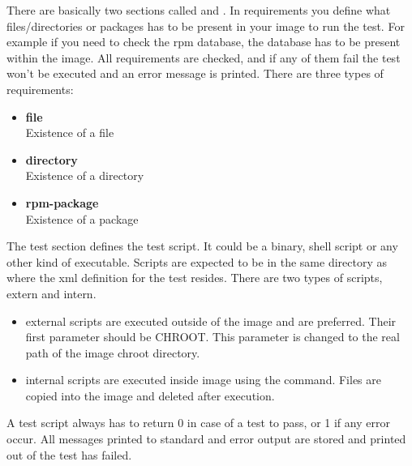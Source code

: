 There are basically two sections called  and .
In requirements you define what files/directories or packages has to be
present in your image to run the test. For example if you need to check
the rpm database, the database has to be present within the image.
All requirements are checked, and if any of them fail the test won't be
executed and an error message is printed. There are three types of
requirements:

\begin{itemize}
\item \textbf{file}\\
      Existence of a file
\item \textbf{directory}\\
      Existence of a directory
\item \textbf{rpm-package}\\
      Existence of a package
\end{itemize}

The test section defines the test script. It could be a binary,
shell script or any other kind of executable. Scripts are expected to be in
the same directory as where the xml definition for the test resides.
There are two types of scripts, extern and intern.

\begin{itemize}
\item external scripts are executed outside of the image and are preferred.
      Their first parameter should be CHROOT. This parameter
      is changed to the real path of the image chroot directory.

\item internal scripts are executed inside image using the  command.
      Files are copied into the image and deleted after execution.
\end{itemize}

A test script always has to return 0 in case of a test to pass, or 1 if
any error occur. All messages printed to standard and error output are stored
and printed out of the test has failed.


